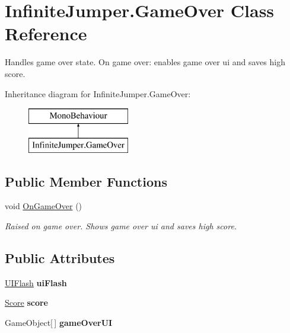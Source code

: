\hypertarget{class_infinite_jumper_1_1_game_over}{}\section{Infinite\+Jumper.\+Game\+Over Class Reference}
\label{class_infinite_jumper_1_1_game_over}


Handles game over state. On game over\+: enables game over ui and saves high score.  


Inheritance diagram for Infinite\+Jumper.\+Game\+Over\+:\begin{figure}[H]
\begin{center}
\leavevmode
\includegraphics[height=2.000000cm]{class_infinite_jumper_1_1_game_over}
\end{center}
\end{figure}
\subsection*{Public Member Functions}
\begin{DoxyCompactItemize}
\item 
void \hyperlink{class_infinite_jumper_1_1_game_over_ab7f485b5a99f17e3046e9b1cd1ea7349}{On\+Game\+Over} ()
\begin{DoxyCompactList}\small\item\em Raised on game over. Shows game over ui and saves high score. \end{DoxyCompactList}\end{DoxyCompactItemize}
\subsection*{Public Attributes}
\begin{DoxyCompactItemize}
\item 
\hypertarget{class_infinite_jumper_1_1_game_over_a0dc574363fe6d253f33ab465b2b1f8ae}{}\hyperlink{class_infinite_jumper_1_1_u_i_flash}{U\+I\+Flash} {\bfseries ui\+Flash}\label{class_infinite_jumper_1_1_game_over_a0dc574363fe6d253f33ab465b2b1f8ae}

\item 
\hypertarget{class_infinite_jumper_1_1_game_over_af0aa43b3cd50a2746ba85a544e567fea}{}\hyperlink{class_infinite_jumper_1_1_score}{Score} {\bfseries score}\label{class_infinite_jumper_1_1_game_over_af0aa43b3cd50a2746ba85a544e567fea}

\item 
\hypertarget{class_infinite_jumper_1_1_game_over_ae4b1237ee394a9210d09a2a3484297c5}{}Game\+Object\mbox{[}$\,$\mbox{]} {\bfseries game\+Over\+U\+I}\label{class_infinite_jumper_1_1_game_over_ae4b1237ee394a9210d09a2a3484297c5}

\end{DoxyCompactItemize}


